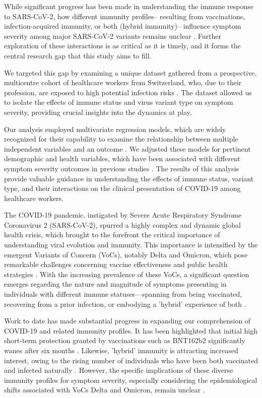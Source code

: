 \documentclass[11pt]{article}
\begin{document}
While significant progress has been made in understanding the immune response to SARS-CoV-2, how different immunity profiles-- resulting from vaccinations, infection-acquired immunity, or both (hybrid immunity)-- influence symptom severity among major SARS-CoV-2 variants remains unclear \cite{Lin2021TheDS,Thye2021EmergingSV}. Further exploration of these interactions is as critical as it is timely, and it forms the central research gap that this study aims to fill. 

We targeted this gap by examining a unique dataset gathered from a prospective, multicentre cohort of healthcare workers from Switzerland, who, due to their profession, are exposed to high potential infection risks \cite{Lang2023InfluenzaVB,Piccoli2020RiskAA,Schwappach2018SpeakUC}. The dataset allowed us to isolate the effects of immune status and virus variant type on symptom severity, providing crucial insights into the dynamics at play.

Our analysis employed multivariate regression models, which are widely recognized for their capability to examine the relationship between multiple independent variables and an outcome \cite{Tsanas2011NonlinearSA}. We adjusted these models for pertinent demographic and health variables, which have been associated with different symptom severity outcomes in previous studies \cite{Chun2014ImpactOV}. The results of this analysis provide valuable guidance in understanding the effects of immune status, variant type, and their interactions on the clinical presentation of COVID-19 among healthcare workers.

The COVID-19 pandemic, instigated by Severe Acute Respiratory Syndrome Coronavirus 2 (SARS-CoV-2), spurred a highly complex and dynamic global health crisis, which brought to the forefront the critical importance of understanding viral evolution and immunity. This importance is intensified by the emergent Variants of Concern (VoCs), notably Delta and Omicron, which pose remarkable challenges concerning vaccine effectiveness and public health strategies \cite{Thye2021EmergingSV, Carabelli2023SARSCoV2VB}. With the increasing prevalence of these VoCs, a significant question emerges regarding the nature and magnitude of symptoms presenting in individuals with different immune statuses—spanning from being vaccinated, recovering from a prior infection, or embodying a 'hybrid' experience of both \cite{Hall2022ProtectionAS}.

Work to date has made substantial progress in expanding our comprehension of COVID-19 and related immunity profiles. It has been highlighted that initial high short-term protection granted by vaccinations such as BNT162b2 significantly wanes after six months \cite{Hall2022ProtectionAS}. Likewise, 'hybrid' immunity is attracting increased interest, owing to the rising number of individuals who have been both vaccinated and infected naturally \cite{Goldberg2022ProtectionAW}. However, the specific implications of these diverse immunity profiles for symptom severity, especially considering the epidemiological shifts associated with VoCs Delta and Omicron, remain unclear \cite{Lin2021TheDS}.
\end{document}
